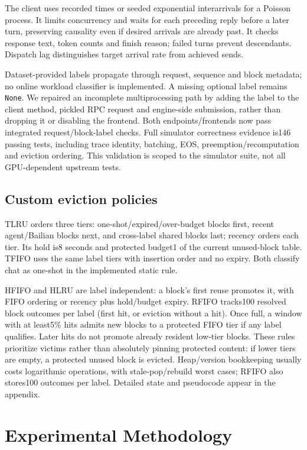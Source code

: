 \documentclass{article}
\begin{document}
The client uses recorded times or seeded exponential interarrivals for a Poisson process. It limits concurrency and waits for each preceding reply before a later turn, preserving causality even if desired arrivals are already past. It checks response text, token counts and finish reason; failed turns prevent descendants. Dispatch lag distinguishes target arrival rate from achieved sends.

Dataset-provided labels propagate through request, sequence and block metadata; no online workload classifier is implemented. A missing optional label remains \texttt{None}. We repaired an incomplete multiprocessing path by adding the label to the client method, pickled RPC request and engine-side submission, rather than dropping it or disabling the frontend. Both endpoints/frontends now pass integrated request/block-label checks. Full simulator correctness evidence is146 passing tests, including trace identity, batching, EOS, preemption/recomputation and eviction ordering. This validation is scoped to the simulator suite, not all GPU-dependent upstream tests.

\subsection{Custom eviction policies}
TLRU orders three tiers: one-shot/expired/over-budget blocks first, recent agent/Bailian blocks next, and cross-label shared blocks last; recency orders each tier. Its hold is8 seconds and protected budget1 of the current unused-block table. TFIFO uses the same label tiers with insertion order and no expiry. Both classify chat as one-shot in the implemented static rule.

HFIFO and HLRU are label independent: a block's first reuse promotes it, with FIFO ordering or recency plus hold/budget expiry. RFIFO tracks100 resolved block outcomes per label (first hit, or eviction without a hit). Once full, a window with at least5\% hits admits new blocks to a protected FIFO tier if any label qualifies. Later hits do not promote already resident low-tier blocks. These rules prioritize victims rather than absolutely pinning protected content: if lower tiers are empty, a protected unused block is evicted. Heap/version bookkeeping usually costs logarithmic operations, with stale-pop/rebuild worst cases; RFIFO also stores100 outcomes per label. Detailed state and pseudocode appear in the appendix.

\section{Experimental Methodology}
\end{document}
